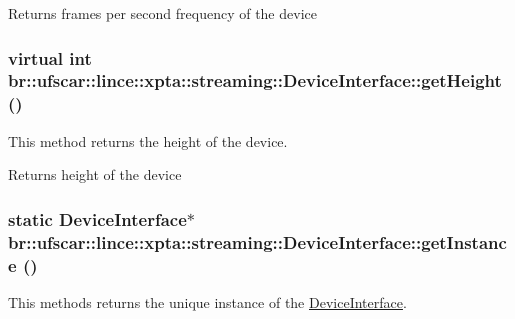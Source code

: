 \begin{DoxyReturn}{Returns}
frames per second frequency of the device 
\end{DoxyReturn}
\hypertarget{classbr_1_1ufscar_1_1lince_1_1xpta_1_1streaming_1_1DeviceInterface_a924cf429c4bb03aed22701e0e331d50d}{
\subsubsection[{getHeight}]{\setlength{\rightskip}{0pt plus 5cm}virtual int br::ufscar::lince::xpta::streaming::DeviceInterface::getHeight ()}}
\label{classbr_1_1ufscar_1_1lince_1_1xpta_1_1streaming_1_1DeviceInterface_a924cf429c4bb03aed22701e0e331d50d}


This method returns the height of the device. 

\begin{DoxyReturn}{Returns}
height of the device 
\end{DoxyReturn}
\hypertarget{classbr_1_1ufscar_1_1lince_1_1xpta_1_1streaming_1_1DeviceInterface_aeb8554f01e992799ab15336f45829cd6}{
\subsubsection[{getInstance}]{\setlength{\rightskip}{0pt plus 5cm}static {\bf DeviceInterface}$\ast$ br::ufscar::lince::xpta::streaming::DeviceInterface::getInstance ()}}
\label{classbr_1_1ufscar_1_1lince_1_1xpta_1_1streaming_1_1DeviceInterface_aeb8554f01e992799ab15336f45829cd6}


This methods returns the unique instance of the \hyperlink{classbr_1_1ufscar_1_1lince_1_1xpta_1_1streaming_1_1DeviceInterface}{DeviceInterface}. 

